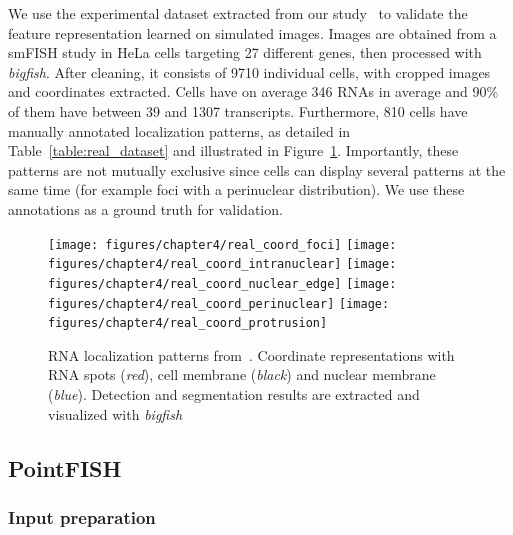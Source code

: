 We use the experimental dataset extracted from our study~\cite{CHOUAIB_2020} to validate the feature representation learned on simulated images.
Images are obtained from a \ac{smFISH} study in HeLa cells targeting 27 different genes, then processed with \emph{bigfish}.
After cleaning, it consists of 9710 individual cells, with cropped images and coordinates extracted.
Cells have on average 346 \ac{RNA}s in average and 90\% of them have between 39 and 1307 transcripts.
Furthermore, 810 cells have manually annotated localization patterns, as detailed in Table~\ref{table:real_dataset} and illustrated in Figure~\ref{fig:localization_patterns_racha_features}.
Importantly, these patterns are not mutually exclusive since cells can display several patterns at the same time (for example foci with a perinuclear distribution).
We use these annotations as a ground truth for validation.

\begin{figure}[h]
	\centering
		\texttt{[image: figures/chapter4/real\_coord\_foci]}
	\endminipage\hfill
		\texttt{[image: figures/chapter4/real\_coord\_intranuclear]}
	\endminipage\hfill
		\texttt{[image: figures/chapter4/real\_coord\_nuclear\_edge]}
	\endminipage\hfill
		\texttt{[image: figures/chapter4/real\_coord\_perinuclear]}
	\endminipage\hfill
		\texttt{[image: figures/chapter4/real\_coord\_protrusion]}
	\endminipage
	\caption{RNA localization patterns from~\cite{CHOUAIB_2020}.
	Coordinate representations with RNA spots (\textit{red}), cell membrane (\textit{black}) and nuclear membrane (\textit{blue}).
	Detection and segmentation results are extracted and visualized with \emph{bigfish}}
	\label{fig:localization_patterns_racha_features}
\end{figure}

\subsection{PointFISH}
\label{subsec:pointfish}

\subsubsection{Input preparation}

